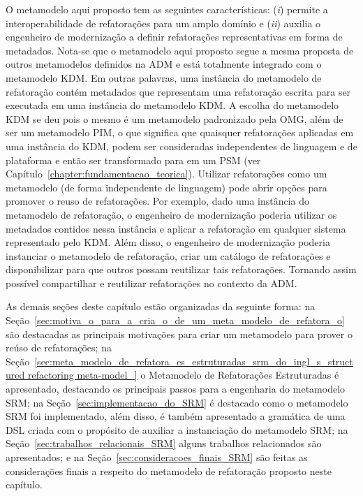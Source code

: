O metamodelo aqui proposto tem as seguintes características: (\textit{i}) permite a interoperabilidade de refatorações para um amplo domínio e (\textit{ii}) auxilia o engenheiro de modernização a definir refatorações representativas em forma de metadados. Nota-se que o metamodelo aqui proposto segue a mesma proposta de outros metamodelos definidos na ADM e está totalmente integrado com o metamodelo KDM. Em outras palavras, uma instância do metamodelo de refatoração contém metadados que representam uma refatoração escrita para ser executada em uma instância do metamodelo KDM. A escolha do metamodelo KDM se deu pois o mesmo é um metamodelo padronizado pela OMG, além de ser um metamodelo PIM, o que significa que quaisquer refatorações aplicadas em uma instância do KDM, podem ser consideradas independentes de linguagem e de plataforma e então ser transformado para em um PSM (ver Capítulo~\ref{chapter:fundamentacao_teorica}). Utilizar refatorações como um metamodelo (de forma independente de linguagem) pode abrir opções para promover o reuso de refatorações. Por exemplo, dado uma instância do metamodelo de refatoração, o engenheiro de modernização poderia utilizar os metadados contidos nessa instância e aplicar a refatoração em qualquer sistema representado pelo KDM. Além disso, o engenheiro de modernização poderia instanciar o metamodelo de refatoração, criar um catálogo de refatorações e disponibilizar para que outros possam reutilizar tais refatorações. Tornando assim possível compartilhar e reutilizar refatorações no contexto da ADM.


As demais seções deste capítulo estão organizadas da seguinte forma: na Seção~\ref{sec:motiva_o_para_a_cria_o_de_um_meta_modelo_de_refatora_o} são destacadas as principais motivações para criar um metamodelo para prover o reúso de refatorações; na Seção~\ref{sec:meta_modelo_de_refatora_es_estruturadas_srm_do_ingl_s_structured refactoring meta-model_} o Metamodelo de Refatorações Estruturadas é apresentado, destacando os principais passos para a engenharia do metamodelo SRM; na Seção~\ref{sec:implementacao_do_SRM}  é destacado como o metamodelo SRM foi implementado, além disso, é também apresentado a gramática de uma DSL criada com o propósito de auxiliar a instanciação do metamodelo SRM; na Seção~\ref{sec:trabalhos_relacionais_SRM} alguns trabalhos relacionados são apresentados; e na Seção~\ref{sec:consideracoes_finais_SRM} são feitas as considerações finais a respeito do metamodelo de refatoração proposto neste capítulo.

